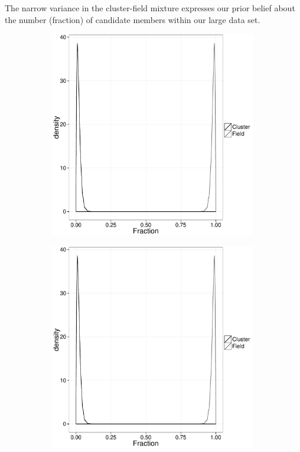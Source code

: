The narrow variance in the cluster-field mixture expresses our prior belief about the number (fraction) of candidate members within our large data set.

\begin{figure}[ht!]
    \centering
    \begin{subfigure}[t]{0.48\textwidth}
        \includegraphics[page=1,height=9cm,width=\textwidth]{background/Figures/Priors.pdf}
        \caption{}
        \label{}
    \end{subfigure}
    \begin{subfigure}[t]{0.48\textwidth}
      \includegraphics[page=2,height=9cm,width=\textwidth]{background/Figures/Priors.pdf}
        \caption{}
        \label{} 
    \end{subfigure}
     \begin{subfigure}[t]{0.48\textwidth}

\end{subfigure}
\end{figure}
